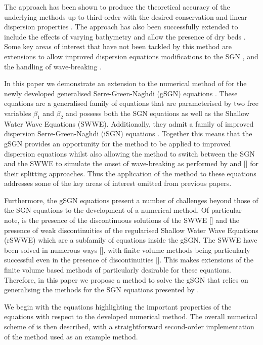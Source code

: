 \documentclass[10pt]{elsarticle}
\begin{document}
The approach has been shown to produce the theoretical accuracy of the underlying methods up to third-order \cite{Zoppou-etal-2017,Pitt-2019} with the desired conservation and linear dispersion properties \cite{Pitt-2019}. The approach has also been successfully extended to include the effects of varying bathymetry and allow the presence of dry beds \cite{Pitt-2019}. Some key areas of interest that have not been tackled by this method are extensions to allow improved dispersion equations modifications to the SGN \cite{Zoppou-etal-2017}, and the handling of wave-breaking \cite{Pitt-2019}. 

In this paper we demonstrate an extension to the numerical method of \citet{Zoppou-etal-2017} for the newly developed generalised Serre-Green-Naghdi (gSGN) equations \cite{Clamond-Dutykh-2018-237}. These equations are a generalised family of equations that are parameterised by two free variables $\beta_1$ and $\beta_2$ and possess both the SGN equations as well as the Shallow Water Wave Equations (SWWE). Additionally, they admit a family of improved dispersion Serre-Green-Naghdi (iSGN) equations \cite{Clamond-et.al-2017-245}. Together this means that the gSGN provides an opportunity for the method to be applied to improved dispersion equations whilst also allowing the method to switch between the SGN and the SWWE to simulate the onset of wave-breaking as performed by \citet{Tissier-2011} and \citet{Filippini-etal-2016-381} [] for their splitting approaches. Thus the application of the method to these equations addresses some of the key areas of interest omitted from previous papers. 

Furthermore, the gSGN equations present a number of challenges beyond those of the SGN equations to the development of a numerical method. Of particular note, is the presence of the discontinuous solutions of the SWWE [] and the presence of weak discontinuities of the regularised Shallow Water Wave Equations (rSWWE) \cite{Pu-2018-1361} which are a subfamily of equations inside the gSGN. The SWWE have been solved in numerous ways [], with finite volume methods being particularly successful even in the presence of discontinuities []. This makes extensions of the finite volume based methods of \cite{Hank-etal-2010-2034,Zoppou-etal-2017} particularly desirable for these equations. Therefore, in this paper we propose a method to solve the gSGN that relies on generalising the methods for the SGN equations presented by \citet{Zoppou-etal-2017}.

We begin with the equations highlighting the important properties of the equations with respect to the developed numerical method. The overall numerical scheme of \citet{Zoppou-etal-2017} is then described, with a straightforward second-order implementation of the method used as an example method. 
\end{document}
